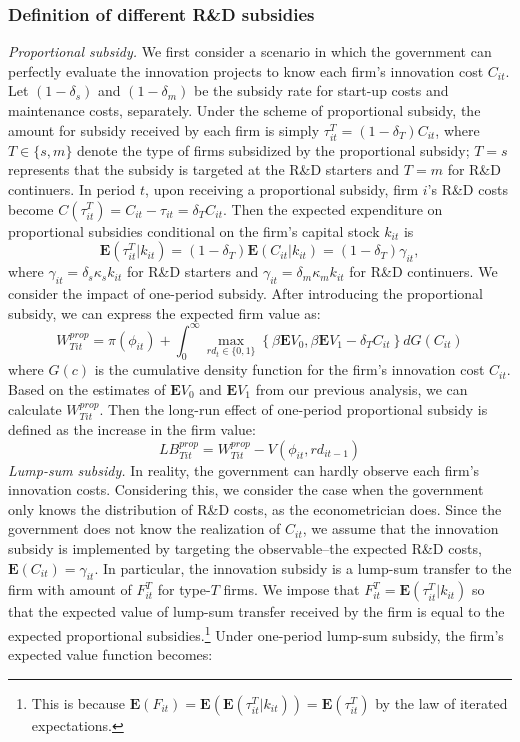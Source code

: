 \documentclass[11pt]{article}
\begin{document}
\subsubsection{Definition of different R\&D subsidies}
\textit{Proportional subsidy.} We first consider a scenario in which the government can perfectly evaluate the innovation projects to know each firm's innovation cost $C_{it}$. Let $(1-\delta_s)$ and $(1-\delta_m)$ be the subsidy rate for start-up costs and maintenance costs, separately. Under the scheme of proportional subsidy, the amount for subsidy received by each firm is simply $\tau_{it}^{T} = (1-\delta_T)C_{it}$, where $T\in\{s,m\}$ denote the type of firms subsidized by the proportional subsidy; $T=s$ represents that the subsidy is targeted at the R\&D starters and $T=m$ for R\&D continuers.  In period $t$, upon receiving a proportional subsidy, firm $i$'s R\&D costs become $C(\tau_{it}^T) = C_{it}-\tau_{it}=\delta_T C_{it}$. Then the expected expenditure on proportional subsidies conditional on the firm's capital stock $k_{it}$ is 
\begin{equation}
    \mathbf{E}(\tau_{it}^T|k_{it}) = (1-\delta_T)\mathbf{E}(C_{it}|k_{it})=(1-\delta_T)\gamma_{it},
\end{equation}
where $ \gamma_{it}= \delta_s\kappa_sk_{it}$ for R\&D starters and $\gamma_{it}=\delta_m\kappa_m k_{it}$ for R\&D continuers. We consider the impact of one-period subsidy. After introducing the proportional subsidy, we can express the expected firm value as:
\begin{equation}\label{wz}  
W_{Tit}^{prop}=\pi(\phi_{it})+ \int_0^{\infty}\max_{rd_t\in\{0,1\}}\left\{\beta \mathbf{E}V_{0},  \beta \mathbf{E}V_{1}-\delta_T C_{it}\right\}dG(C_{it})
\end{equation}
where $G(c)$ is the cumulative density function for the firm's innovation cost $C_{it}$. Based on the estimates of $\mathbf{E}V_{0}$ and  $\mathbf{E}V_1$ from our previous analysis, we can calculate $W_{Tit}^{prop}$. Then the long-run effect of one-period proportional subsidy is defined as the increase in the firm value:
\begin{equation}
    LB_{Tit}^{prop}=W_{Tit}^{prop}-V(\phi_{it}, rd_{it-1})
\end{equation}
\textit{Lump-sum subsidy.} In reality, the government can hardly observe each firm's innovation costs. Considering this, we consider the case when the government only knows the distribution of R\&D costs, as the econometrician does. Since the government does not know the realization of $C_{it}$, we assume that the innovation subsidy is implemented by targeting the observable--the expected R\&D costs, $\mathbf{E}(C_{it})=\gamma_{it}$. In particular, the innovation subsidy is a lump-sum transfer to the firm with amount of $F_{it}^{T}$ for type-$T$ firms. We impose that $F_{it}^{T} = \mathbf{E}(\tau_{it}^T|k_{it})$ so that the expected value of lump-sum transfer received by the firm is equal to the expected proportional subsidies.\footnote{This is because $\mathbf{E}(F_{it})=\mathbf{E}(\mathbf{E}(\tau_{it}^T|k_{it}))=\mathbf{E}(\tau_{it}^{T})$ by the law of iterated expectations.} Under one-period lump-sum subsidy, the firm's expected value function becomes:
\end{document}
